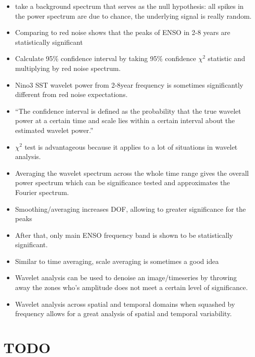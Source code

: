 \documentclass[11pt]{article}
\begin{document}
\begin{itemize}
\item take a background spectrum that serves as the null hypothesis: all spikes in the power spectrum are due to chance, the underlying signal is really random.
\item Comparing to red noise shows that the peaks of ENSO in 2-8 years are statistically significant
\item Calculate 95\% confidence interval by taking 95\% confidence \(\chi^2\) statistic and multiplying by red noise spectrum.
\item Nino3 SST wavelet power from 2-8year frequency is sometimes significantly different from red noise expectations.
\item ``The confidence interval is defined as the probability that the true wavelet power at a certain time and scale lies within a certain interval about the estimated wavelet power.''
\item \(\chi^2\) test is advantageous because it applies to a lot of situations in wavelet analysis.
\item Averaging the wavelet spectrum across the whole time range gives the overall power spectrum which can be significance tested and approximates the Fourier spectrum.
\item Smoothing/averaging increases DOF, allowing to greater significance for the peaks
\item After that, only main ENSO frequency band is shown to be statistically significant.
\item Similar to time averaging, scale averaging is sometimes a good idea
\item Wavelet analysis can be used to denoise an image/timeseries by throwing away the zones who's amplitude does not meet a certain level of significance.
\item Wavelet analysis across spatial and temporal domains when squashed by frequency allows for a great analysis of spatial and temporal variability.
\end{itemize}

\section{{\bfseries\sffamily TODO} \cite{vecchi2006weakening}}
\label{sec:orgbbf1261}

\section{\cite{vega2017analysis}}
\label{sec:org27d5f82}
\end{document}

